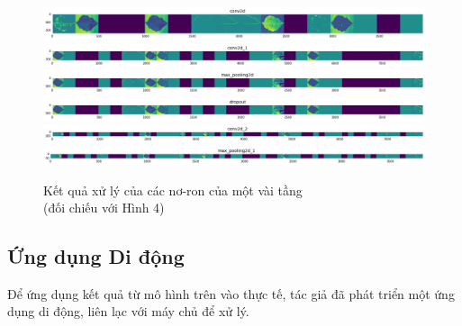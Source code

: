 \documentclass[a4paper,14pt]{extarticle}
\begin{document}
	\begin{figure}[H]
		\centering
		\captionsetup{justification=centering}
		\includegraphics[scale=0.32]{images/image5}
		\includegraphics[scale=0.32]{images/image6}
		\includegraphics[scale=0.32]{images/image4}
		\includegraphics[scale=0.32]{images/image8}
		\includegraphics[scale=0.32]{images/image12}
		\includegraphics[scale=0.32]{images/image14}
		\caption{Kết quả xử lý của các nơ-ron của một vài tầng\\(đối chiếu với Hình 4)}
	\end{figure}

	\subsection{Ứng dụng Di động}
	Để ứng dụng kết quả từ mô hình trên vào thực tế, tác giả đã phát triển một ứng dụng di động, liên lạc với máy chủ để xử lý.
\end{document}

